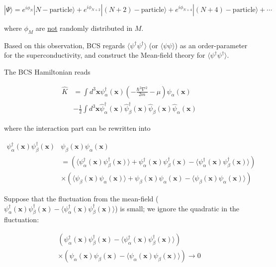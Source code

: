 ﻿\documentclass[twoside]{book}
\numberwithin{equation}{section}
\begin{document}
\[|\Psi\rangle = e^{i\phi_N}|N-\text{particle}\rangle + e^{i\phi_{N+2}}|(N+2)-\text{particle}\rangle + e^{i\phi_{N+4}}|(N+4)-\text{particle}\rangle + \cdots  \]

where $\phi_M$ are \uline{not} randomly distributed in $M$. 

Based on this observation, BCS regards $\langle\psi^{\dagger}\psi^{\dagger}\rangle$ (or $\langle \psi\psi\rangle$) as an order-parameter for the superconductivity, and construct the Mean-field theory for $\langle \psi^{\dagger}\psi^{\dagger}\rangle$. 

The BCS Hamiltonian reads 

\[\begin{split}\hat{K}& = \int d^3 \bm{x}\psi^{\dagger}_{\alpha}(\bm{x})\left(-\frac{\hbar^2\nabla^2}{2m} - \mu\right)\psi_{\alpha}(\bm{x})\\
&-\frac{1}{2} \int d^3\bm{x} \hat{\psi}_{\alpha}^{\dagger}(\bm{x}) \hat{\psi}_{\beta}^{\dagger}(\bm{x}) \hat{\psi}_{\beta}(\bm{x})\hat{\psi}_{\alpha}(\bm{x}) \end{split}\]

where the interaction part can be rewritten into 

\[\begin{split}\psi_{\alpha}^{\dagger}(\bm{x})\psi_{\beta}^{\dagger}(\bm{x})&\psi_{\beta}(\bm{x})\psi_{\alpha}(\bm{x})\\
 &=  \left(\langle\psi^{\dagger}_{\alpha}(\bm{x})\psi^{\dagger}_{\beta}(\bm{x})\rangle + \psi^{\dagger}_{\alpha}(\bm{x})\psi^{\dagger}_{\beta}(\bm{x}) - \langle\psi^{\dagger}_{\alpha}(\bm{x})\psi^{\dagger}_{\beta}(\bm{x})\rangle\right)\\
&\times \left(\langle\psi_{\beta}(\bm{x})\psi_{\alpha}(\bm{x})\rangle + \psi_{\beta}(\bm{x})\psi_{\alpha}(\bm{x}) - \langle\psi_{\beta}(\bm{x})\psi_{\alpha}(\bm{x})\rangle\right)
\end{split}\]

Suppose that the fluctuation from the mean-field ($\psi^{\dagger}_{\alpha}(\bm{x})\psi^{\dagger}_{\beta}(\bm{x}) - \langle\psi^{\dagger}_{\alpha}(\bm{x})\psi^{\dagger}_{\beta}(\bm{x})\rangle$) is small; we ignore the quadratic in the fluctuation: 

\[\begin{split}
\left(\psi^{\dagger}_{\alpha}(\bm{x})\psi^{\dagger}_{\beta}(\bm{x}) - \langle\psi^{\dagger}_{\alpha}(\bm{x})\psi^{\dagger}_{\beta}(\bm{x})\rangle\right)\\
\times \left(\psi_{\alpha}(\bm{x})\psi_{\beta}(\bm{x}) - \langle\psi_{\alpha}(\bm{x})\psi_{\beta}(\bm{x})\rangle\right) \rightarrow 0\end{split}\]
\end{document}
